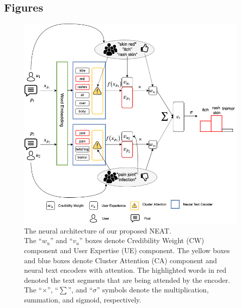 \documentclass{bmcart}
\begin{document}
\begin{backmatter}
\pagebreak

\section*{Figures}
\begin{figure}[h!]
    \centering
    \captionsetup{justification=centering}
    \includegraphics[scale=0.5]{neat.png}
    \caption{The neural architecture of our proposed NEAT. \\ The ``$w_u$'' and ``$v_u$'' boxes denote Credibility Weight (CW) component and User Expertise (UE) component. The yellow boxes and blue boxes denote Cluster Attention (CA) component and neural text encoders with attention. The highlighted words in red denoted the text segments that are being attended by the encoder. The ``$\times$'', ``$\sum$'', and ``$\sigma$'' symbols denote the multiplication, summation, and sigmoid, respectively.}
    \label{fig:NEAT}
\end{figure}
\pagebreak
\begin{figure}[h!]
    \centering
    \captionsetup{justification=centering}

\end{figure}
\end{backmatter}
\end{document}
